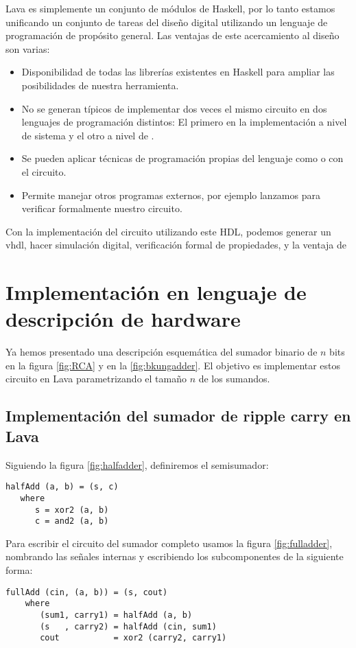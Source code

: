 Lava es simplemente un conjunto de módulos de Haskell, por lo tanto estamos unificando un conjunto de tareas del diseño digital utilizando un lenguaje de programación de propósito general. Las ventajas de este acercamiento al diseño son varias: 

\begin{itemize}
\item Disponibilidad de todas las librerías existentes en Haskell para ampliar las posibilidades de nuestra herramienta.
\item No se generan  típicos de implementar dos veces el mismo circuito en dos lenguajes de programación distintos: El primero en la implementación a nivel de sistema y el otro a nivel de .
\item Se pueden aplicar técnicas de programación propias del lenguaje como  o  con el circuito.
\item Permite manejar otros programas externos, por ejemplo lanzamos \cite{minisat} para verificar formalmente nuestro circuito.  
\end{itemize}


Con la implementación del circuito utilizando este HDL, podemos generar un  \gls{vhdl}, hacer simulación digital, verificación formal de propiedades, y la ventaja de  


\section{Implementación en lenguaje de descripción de hardware}
Ya hemos presentado una descripción esquemática del sumador binario de \(n\) bits en la figura \ref{fig:RCA} y en la \ref{fig:bkungadder}. El objetivo es implementar estos circuito en Lava parametrizando el tamaño \(n\) de los sumandos. 

\subsection{Implementación del sumador de \textbf {ripple carry} en Lava}

\noindent Siguiendo la figura \ref{fig:halfadder}, definiremos el semisumador:
\begin{lstlisting}
halfAdd (a, b) = (s, c)
   where
      s = xor2 (a, b)
      c = and2 (a, b)
\end{lstlisting}
\noindent Para escribir el circuito del sumador completo usamos la figura \ref{fig:fulladder}, nombrando las señales internas y 
escribiendo los subcomponentes de la siguiente forma:
\begin{lstlisting}
fullAdd (cin, (a, b)) = (s, cout)
    where
       (sum1, carry1) = halfAdd (a, b)
       (s   , carry2) = halfAdd (cin, sum1)
       cout           = xor2 (carry2, carry1)
\end{lstlisting}

